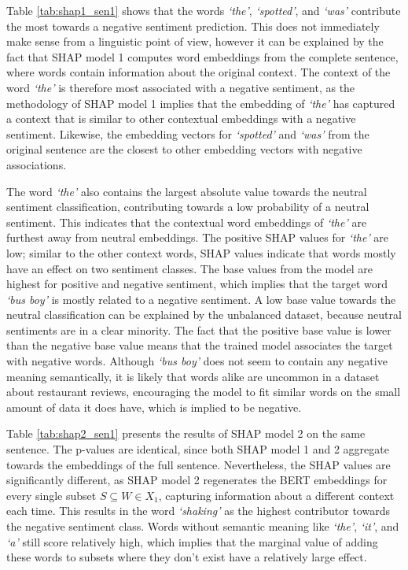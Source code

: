 Table \ref{tab:shap1_sen1} shows that the words \textit{`the'}, \textit{`spotted'}, and \textit{`was'} contribute the most towards a negative sentiment prediction. This does not immediately make sense from a linguistic point of view, however it can be explained by the fact that SHAP model 1 computes word embeddings from the complete sentence, where words contain information about the original context. The context of the word \textit{`the'} is therefore most associated with a negative sentiment, as the methodology of SHAP model 1 implies that the embedding of \textit{`the'} has captured a context that is similar to other contextual embeddings with a negative sentiment. Likewise, the embedding vectors for \textit{`spotted'} and \textit{`was'} from the original sentence are the closest to other embedding vectors with negative associations. 

The word \textit{`the'} also contains the largest absolute value towards the neutral sentiment classification, contributing towards a low probability of a neutral sentiment. This indicates that the contextual word embeddings of \textit{`the'} are furthest away from neutral embeddings. The positive SHAP values for \textit{`the'} are low; similar to the other context words, SHAP values indicate that words mostly have an effect on two sentiment classes. 
The base values from the model are highest for positive and negative sentiment, which implies that the target word \textit{`bus boy'} is mostly related to a negative sentiment. A low base value towards the neutral classification can be explained by the unbalanced dataset, because neutral sentiments are in a clear minority. The fact that the positive base value is lower than the negative base value means that the trained model associates the target with negative words. Although \textit{`bus boy'} does not seem to contain any negative meaning semantically, it is likely that words alike are uncommon in a dataset about restaurant reviews, encouraging the model to fit similar words on the small amount of data it does have, which is implied to be negative.

Table \ref{tab:shap2_sen1} presents the results of SHAP model 2 on the same sentence. The p-values are identical, since both SHAP model 1 and 2 aggregate towards the embeddings of the full sentence. Nevertheless, the SHAP values are significantly different, as SHAP model 2 regenerates the BERT embeddings for every single subset $S \subseteq W \in X_1$, capturing information about a different context each time. This results in the word \textit{`shaking'} as the highest contributor towards the negative sentiment class. Words without semantic meaning like \textit{`the'}, \textit{`it'}, and \textit{`a'} still score relatively high, which implies that the marginal value of adding these words to subsets where they don't exist have a relatively large effect.

